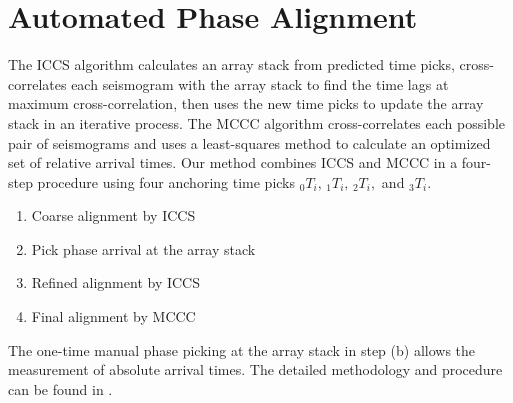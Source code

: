 \documentclass[letterpaper,10pt,english]{sphinxmanual}
\begin{document}
\section{Automated Phase Alignment}
\label{docfiles/PickingTravelTimes:automated-phase-alignment}
The ICCS algorithm calculates an array stack from predicted time picks, cross-correlates each seismogram with the array stack to find the time lags at maximum cross-correlation, then uses the new time picks to update the array stack in an iterative process. The MCCC algorithm cross-correlates each possible pair of seismograms and uses a least-squares method to calculate an optimized set of relative arrival times. Our method combines ICCS and MCCC in a four-step procedure using four anchoring time picks \(_0T_i,\,_1T_i,\,_2T_i,\) and \(_3T_i\).
\begin{enumerate}
\item {} 
Coarse alignment by ICCS

\item {} 
Pick phase arrival at the array stack

\item {} 
Refined alignment by ICCS

\item {} 
Final alignment by MCCC

\end{enumerate}

The one-time manual phase picking at the array stack in step (b) allows the measurement of absolute arrival times. The detailed methodology and procedure can be found in \label{docfiles/PickingTravelTimes:id1}{\hyperref[docfiles/citations:louvanderlee2013]{\crossref{{[}LouVanDerLee2013{]}}}}.
\end{document}
